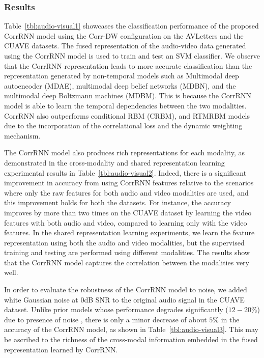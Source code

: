 \documentclass[10pt,twocolumn,letterpaper]{article}
\begin{document}
\subsubsection{Results}
Table~\ref{tbl:audio-visual1} showcases the classification performance of the proposed CorrRNN model using the Corr-DW configuration on the AVLetters and the CUAVE datasets. The fused representation of the audio-video data generated using the CorrRNN model is used to train and test an SVM classifier. We observe that the CorrRNN representation leads to more accurate classification than the representation generated by non-temporal models such as Multimodal deep autoencoder (MDAE), multimodal deep belief networks (MDBN), and the multimodal deep Boltzmann machines (MDBM). This is because the CorrRNN model is able to learn the temporal dependencies between the two modalities. CorrRNN also outperforms conditional RBM (CRBM), and RTMRBM models due to the incorporation of the correlational loss and the dynamic weighting mechanism. 

The CorrRNN model also produces rich representations for each modality, as demonstrated in the cross-modality and shared representation learning experimental results in Table~\ref{tbl:audio-visual2}. Indeed, there is a significant improvement in accuracy from using CorrRNN features relative to the scenarios where only the raw features for both audio and video modalities are used, and this improvement holds for both the datasets. For instance, the accuracy improves by more than two times on the CUAVE dataset by learning the video features with both audio and video, compared to learning only with the video features. In the shared representation learning experiments, we learn the feature representation using both the audio and video modalities, but the supervised training and testing are performed using different modalities. The results show that the CorrRNN model captures the correlation between the modalities very well.   

In order to evaluate the robustness of the CorrRNN model to noise, we added white Gaussian noise at 0dB SNR to the original audio signal in the CUAVE dataset. Unlike prior models whose performance degrades significantly ($12-20\%$) due to presence of noise , there is only a minor decrease of about $5\%$ in the accuracy of the CorrRNN model, as shown in Table~\ref{tbl:audio-visual3}. This may be ascribed to the richness of the cross-modal information embedded in the fused representation learned by CorrRNN. 
\end{document}
